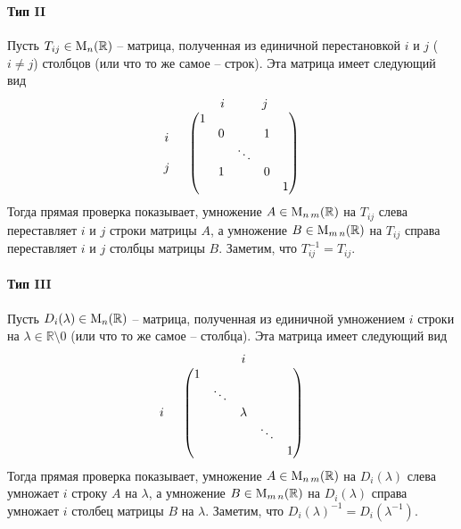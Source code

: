 \paragraph{Тип II}

Пусть $T_{ij}\in\operatorname{M}_{n}(\mathbb R)$ -- матрица, полученная из единичной перестановкой $i$ и $j$ ($i\neq j$) столбцов (или что то же самое -- строк).
Эта матрица имеет следующий вид
\[
\begin{tabular}{cc}
{}&{$i$\quad \quad\quad $j$}\\
{
$
\begin{matrix}
{}\\{i}\\{}\\{j}\\{}
\end{matrix}
$}&{
$
\begin{pmatrix}
{1}&{}&{}&{}&{}\\
{}&{0}&{}&{1}&{}\\
{}&{}&{\ddots}&{}&{}\\
{}&{1}&{}&{0}&{}\\
{}&{}&{}&{}&{1}\\
\end{pmatrix}
$
}
\end{tabular}
\]
Тогда прямая проверка показывает, умножение $A\in\operatorname{M}_{n\,m}(\mathbb R)$ на $T_{ij}$ слева переставляет $i$ и $j$ строки матрицы $A$, а умножение $B\in\operatorname{M}_{m\,n}(\mathbb R)$ на $T_{ij}$ справа переставляет $i$ и $j$ столбцы матрицы $B$.
Заметим, что $T_{ij}^{-1} = T_{ij}$.


\paragraph{Тип III}

Пусть $D_i(\lambda)\in\operatorname{M}_{n}(\mathbb R)$ -- матрица, полученная из единичной умножением $i$ строки на $\lambda\in\mathbb R\setminus 0$ (или что то же самое -- столбца).
Эта матрица имеет следующий вид
\[
\begin{tabular}{cc}
{}&{$i$}\\
{
$
\begin{matrix}
{}\\{}\\{i}\\{}\\{}
\end{matrix}
$}&{
$
\begin{pmatrix}
{1}&{}&{}&{}&{}\\
{}&{\ddots}&{}&{}&{}\\
{}&{}&{\lambda}&{}&{}\\
{}&{}&{}&{\ddots}&{}\\
{}&{}&{}&{}&{1}\\
\end{pmatrix}
$
}
\end{tabular}
\]
Тогда прямая проверка показывает, умножение $A\in\operatorname{M}_{n\,m}(\mathbb R)$ на $D_i(\lambda)$ слева умножает $i$ строку $A$ на $\lambda$, а умножение $B\in\operatorname{M}_{m\,n}(\mathbb R)$ на $D_i(\lambda)$ справа умножает $i$ столбец матрицы $B$ на $\lambda$.
Заметим, что $D_i(\lambda)^{-1}= D_i(\lambda^{-1})$.


